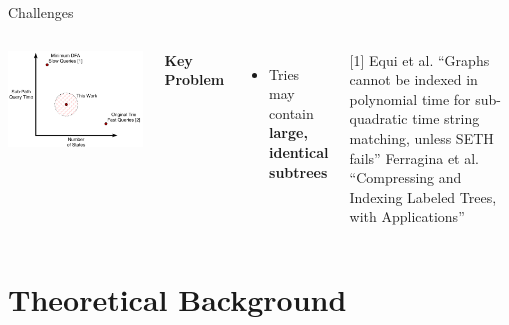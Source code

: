 \documentclass[aspectratio=169]{beamer}
\begin{document}
\begin{frame}{Challenges}
	\begin{columns}[c]
		\centering
		\includegraphics[width=\textwidth]{img/objective.png}

		\textcolor{oiRed}{\textbf{Key Problem}}
		\begin{itemize}
			\item Tries may contain \textbf{large, identical subtrees}
		\end{itemize}
		\vspace{1cm}
		\tiny
		[1] Equi et al. ``Graphs cannot be indexed in polynomial time for sub-quadratic time string matching, unless SETH fails''
		\newline
		[2] Ferragina et al. ``Compressing and Indexing Labeled Trees, with Applications''
	\end{columns}
\end{frame}


\section{Theoretical Background}
\end{document}
